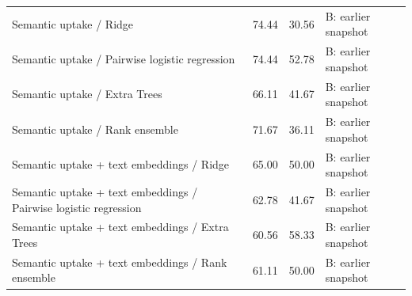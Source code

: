 \documentclass[journal]{IEEEtran}
\begin{document}
\begin{table}[t]
\begin{tabular}{p{}p{}p{}p{}}
{\raggedright Semantic uptake / Ridge\par} & {\raggedright 74.44\par} & {\raggedright 30.56\par} & {\raggedright B: earlier snapshot\par} \\
{\raggedright Semantic uptake / Pairwise logistic regression\par} & {\raggedright 74.44\par} & {\raggedright 52.78\par} & {\raggedright B: earlier snapshot\par} \\
{\raggedright Semantic uptake / Extra Trees\par} & {\raggedright 66.11\par} & {\raggedright 41.67\par} & {\raggedright B: earlier snapshot\par} \\
{\raggedright Semantic uptake / Rank ensemble\par} & {\raggedright 71.67\par} & {\raggedright 36.11\par} & {\raggedright B: earlier snapshot\par} \\
{\raggedright Semantic uptake + text embeddings / Ridge\par} & {\raggedright 65.00\par} & {\raggedright 50.00\par} & {\raggedright B: earlier snapshot\par} \\
{\raggedright Semantic uptake + text embeddings / Pairwise logistic regression\par} & {\raggedright 62.78\par} & {\raggedright 41.67\par} & {\raggedright B: earlier snapshot\par} \\
{\raggedright Semantic uptake + text embeddings / Extra Trees\par} & {\raggedright 60.56\par} & {\raggedright 58.33\par} & {\raggedright B: earlier snapshot\par} \\
{\raggedright Semantic uptake + text embeddings / Rank ensemble\par} & {\raggedright 61.11\par} & {\raggedright 50.00\par} & {\raggedright B: earlier snapshot\par} \\

\end{tabular}
\end{table}
\end{document}
